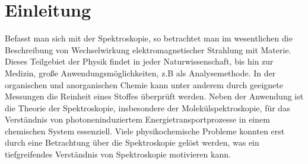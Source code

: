 %

%

\section{Einleitung}
Befasst man sich mit der Spektroskopie, so betrachtet man im wesentlichen die Beschreibung von Wechselwirkung elektromagnetischer Strahlung mit Materie. Dieses Teilgebiet der Physik findet in jeder Naturwissenschaft, bis hin zur Medizin, große Anwendungsmöglichkeiten, z.B als Analysemethode. In der organischen und anorganischen Chemie kann unter anderem durch geeignete Messungen die Reinheit eines Stoffes überprüft werden. Neben der Anwendung ist die Theorie der Spektroskopie, insbesondere der Molekülspektroskopie, für das Verständnis von photoneninduziertem Energietransportprozesse in einem chemischen System essenziell. Viele physikochemische Probleme konnten erst durch eine Betrachtung über die Spektroskopie gelöst werden, was ein tiefgreifendes Verständnis von Spektroskopie motivieren kann.




%





